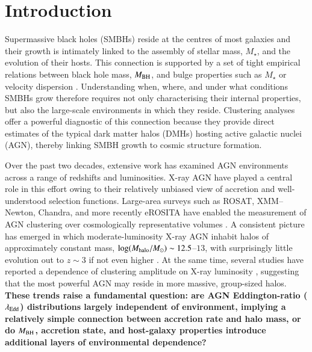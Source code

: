 \documentclass{aa}
\begin{document}
\keywords{}
   
\maketitle  

\section{Introduction}
\label{sec_intro}

Supermassive black holes (SMBHs) reside at the centres of most galaxies and their growth is intimately linked to the assembly of stellar mass, $M_\star$, and the evolution of their hosts. This connection is supported by a set of tight empirical relations between black hole mass, $M_{\rm BH}$, and bulge properties such as $M_\star$ or velocity dispersion \citep[e.g.][]{Magorrian1998, Marconi2003, Haring2004, Kormendy2013}. Understanding when, where, and under what conditions SMBHs grow therefore requires not only characterising their internal properties, but also the large-scale environments in which they reside. Clustering analyses offer a powerful diagnostic of this connection because they provide direct estimates of the typical dark matter halos (DMHs) hosting active galactic nuclei (AGN), thereby linking SMBH growth to cosmic structure formation.

Over the past two decades, extensive work has examined AGN environments across a range of redshifts and luminosities. X-ray AGN have played a central role in this effort owing to their relatively unbiased view of accretion and well-understood selection functions. Large-area surveys such as ROSAT, XMM–Newton, Chandra, and more recently eROSITA have enabled the measurement of AGN clustering over cosmologically representative volumes \citep[e.g.][]{Gilli2005, Coil2009, Krumpe2010b, Koutoulidis2013, Georgakakis2014, Mendez2016, Aird2019, Comparat2023}. A consistent picture has emerged in which moderate-luminosity X-ray AGN inhabit halos of approximately constant mass, $\log (M_{\rm halo}/M_\odot)\sim 12.5$--$13$, with surprisingly little evolution out to $z\sim3$ if not even higher \citep[][]{Allevato2011, Allevato2016}. At the same time, several studies have reported a dependence of clustering amplitude on X-ray luminosity \citep[$L_X$, e.g.][]{Koutoulidis2013, Krumpe2012, Powell2020}, suggesting that the most powerful AGN may reside in more massive, group-sized halos. \textbf{These trends raise a fundamental question: are AGN Eddington-ratio ($\lambda_{\rm Edd}$) distributions largely independent of environment, implying a relatively simple connection between accretion rate and halo mass, or do $M_{\rm BH}$, accretion state, and host-galaxy properties introduce additional layers of environmental dependence?}
\end{document}
